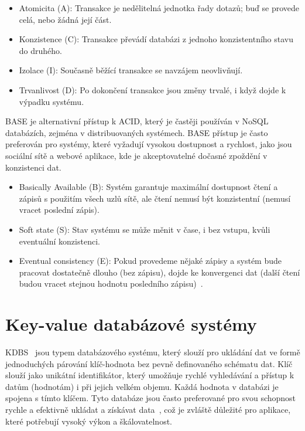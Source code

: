 \documentclass[czech,master,dept460,male,csharp,cpdeclaration]{diploma}
\begin{document}
	\begin{itemize}
		\item Atomicita (A): Transakce je nedělitelná jednotka řady dotazů; buď se provede celá, nebo žádná její část.
		\item Konzistence (C): Transakce převádí databázi z jednoho konzistentního stavu do druhého.
		\item Izolace (I): Současně běžící transakce se navzájem neovlivňují.
		\item Trvanlivost (D): Po dokončení transakce jsou změny trvalé, i když dojde k výpadku systému.
	\end{itemize}
	
	BASE je alternativní přístup k ACID, který je častěji používán v NoSQL databázích, zejména v distribuovaných systémech. BASE přístup je často preferován pro systémy, které vyžadují vysokou dostupnost a rychlost, jako jsou sociální sítě a webové aplikace, kde je akceptovatelné dočasné zpoždění v konzistenci dat.
	
	\begin{itemize}
		\item Basically Available (B): Systém garantuje maximální dostupnost čtení a zápisů s použitím všech uzlů sítě, ale čtení nemusí být konzistentní (nemusí vracet poslední zápis).
		\item Soft state (S): Stav systému se může měnit v čase, i bez vstupu, kvůli eventuální konzistenci.
		\item Eventual consistency (E): Pokud provedeme nějaké zápisy a systém bude pracovat dostatečně dlouho (bez zápisu), dojde ke konvergenci dat (další čtení budou vracet stejnou hodnotu posledního zápisu)~\cite{base-vsb}.
	\end{itemize}
	
	\section{Key-value databázové systémy}
	
	KDBS~\cite{kdbs-oracle, kdbs-redis} jsou typem databázového systému, který slouží pro ukládání dat ve formě jednoduchých párování klíč-hodnota bez pevně definovaného schématu dat. Klíč slouží jako unikátní identifikátor, který umožňuje rychlé vyhledávání a přístup k datům (hodnotám) i při jejich velkém objemu. Každá hodnota v databázi je spojena s tímto klíčem. Tyto databáze jsou často preferované pro svou schopnost rychle a efektivně ukládat a získávat data~\cite{kdbs-quick-fast}, což je zvláště důležité pro aplikace, které potřebují vysoký výkon a škálovatelnost.
	
\end{document}

